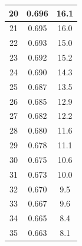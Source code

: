 \documentclass[twocolumn,english]{IEEEtran}
\theoremstyle{plain}
\theoremstyle{plain}
\begin{document}
\begin{table}[H]
\begin{tabular}{|c|c|c|}
  20             & 0.696                & 16.1                  \\ \hline
  21             & 0.695                & 16.0                  \\ \hline
  22             & 0.693                & 15.0                  \\ \hline
  23             & 0.692                & 15.2                  \\ \hline
  24             & 0.690                & 14.3                  \\ \hline
  25             & 0.687                & 13.5                  \\ \hline
  26             & 0.685                & 12.9                  \\ \hline
  27             & 0.682                & 12.2                  \\ \hline
  28             & 0.680                & 11.6                  \\ \hline
  29             & 0.678                & 11.1                  \\ \hline
  30             & 0.675                & 10.6                  \\ \hline
  31             & 0.673                & 10.0                  \\ \hline
  32             & 0.670                & 9.5                   \\ \hline
  33             & 0.667                & 9.6                   \\ \hline
  34             & 0.665                & 8.4                   \\ \hline
  35             & 0.663                & 8.1                   \\ \hline
  \end{tabular}
  \end{table}
\end{document}

